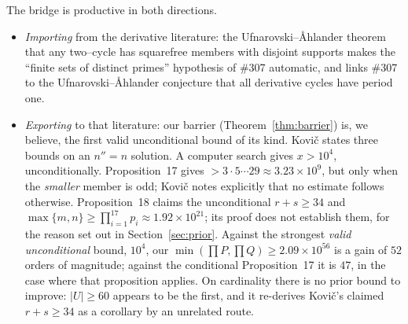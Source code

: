 \documentclass[11pt]{article}
\theoremstyle{definition}
\begin{document}
The bridge is productive in both directions.
\begin{itemize}[leftmargin=1.4em]
\item \emph{Importing} from the derivative literature: the Ufnarovski--\AA hlander theorem that any
two--cycle has squarefree members with disjoint supports \cite{UfnarovskiAhlander2003} makes the
``finite sets of distinct primes'' hypothesis of \#307 automatic, and links \#307 to the
Ufnarovski--\AA hlander conjecture that all derivative cycles have period one.
\item \emph{Exporting} to that literature: our barrier (Theorem~\ref{thm:barrier}) is, we believe,
the first valid unconditional bound of its kind. Kovi\v{c} \cite{Kovic2012} states three bounds on an $n''=n$ solution. A computer
search gives $x>10^4$, unconditionally. Proposition~17 gives $>3\cdot5\cdots29\approx3.23\times10^9$,
but only when the \emph{smaller} member is odd; Kovi\v{c} notes explicitly that no estimate follows
otherwise. Proposition~18 claims the unconditional $r+s\ge34$ and $\max\{m,n\}\ge\prod_{i=1}^{17}p_i
\approx1.92\times10^{21}$; its proof does not establish them, for the reason set out in
Section~\ref{sec:prior}. Against the strongest \emph{valid unconditional} bound, $10^4$, our
$\min(\prod P,\prod Q)\ge2.09\times10^{56}$ is a gain of $52$ orders of magnitude; against the
conditional Proposition~17 it is $47$, in the case where that proposition applies. On cardinality
there is no prior bound to improve: $|U|\ge60$ appears to be the first, and it re-derives
Kovi\v{c}'s claimed $r+s\ge34$ as a corollary by an unrelated route.
\end{itemize}
\end{document}
